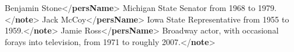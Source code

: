 \begin{shaded}
\hspace*{1em}\hspace*{1em}Benjamin Stone{</\textbf{persName}>}\mbox{}\newline 
\hspace*{1em}\hspace*{1em}Michigan State Senator from 1968 to 1979.{</\textbf{note}>}\mbox{}\newline 
\hspace*{1em}\mbox{}\newline 
\hspace*{1em}\mbox{}\newline 
\hspace*{1em}\hspace*{1em}Jack McCoy{</\textbf{persName}>}\mbox{}\newline 
\hspace*{1em}\hspace*{1em}Iowa State Representative from 1955 to 1959.{</\textbf{note}>}\mbox{}\newline 
\hspace*{1em}\mbox{}\newline 
\hspace*{1em}\mbox{}\newline 
\hspace*{1em}\hspace*{1em}Jamie Ross{</\textbf{persName}>}\mbox{}\newline 
\hspace*{1em}\hspace*{1em}Broadway actor, with occasional forays into television,\mbox{}\newline 
\hspace*{1em}\hspace*{1em}\hspace*{1em}\hspace*{1em}\hspace*{1em}\hspace*{1em} from 1971 to roughly 2007.{</\textbf{note}>}\mbox{}\newline 

\end{shaded}
